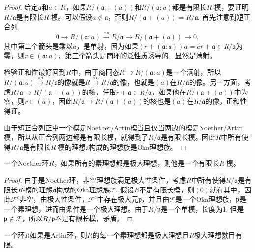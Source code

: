 \begin{proof} 
	给定$\mathfrak{a}$和$a\in R$，如果$R/(\mathfrak{a}+(a))$和$R/(\mathfrak{a}:a)$都是有限长$R$-模，要证明$R/\mathfrak{a}$是有限长$R$-模。可以假设$a\not\in \mathfrak{a}$，否则$R/(\mathfrak{a}+(a))=R/\mathfrak{a}$. 首先注意到短正合列
	\[
		0\to R/(\mathfrak{a}:a)\xrightarrow{\times a} R/\mathfrak{a} \to R/(\mathfrak{a}+(a))\to 0,
	\]
	其中第二个箭头是乘以$a$，是单射，因为如果$(r+(\mathfrak{a}:a))a=ar+\mathfrak{a}\in R/\mathfrak{a}$为零，则$r\in (\mathfrak{a}:a)$，第三个箭头是商环的泛性质诱导的，显然是满射。

	检验正和性最好回到$R$中，由于商同态$R\to R/(\mathfrak{a}:a)$是一个满射，所以$R/(\mathfrak{a}:a)\xrightarrow{\times a} R/\mathfrak{a}$的像就是$R\xrightarrow{\times a} R/\mathfrak{a}$的像，也就是$(a)$在$R/\mathfrak{a}$的像。另一方面，考虑$R/\mathfrak{a} \to R/(\mathfrak{a}+(a))$的核，任取$r+\mathfrak{a}\in R/\mathfrak{a}$，如果他在$R/(\mathfrak{a}+(a))$中为零，则$r\in (a)$，因此$R/\mathfrak{a} \to R/(\mathfrak{a}+(a))$的核也是$(a)$在$R/\mathfrak{a}$的像，正和性得证。

	由于短正合列正中一个模是Noether/Artin模当且仅当两边的模是Noether/Artin模，所以从正合列两边都是有限长模，就得到了$R/\mathfrak{a}$是有限长模。因此$R$中所有使得$R/\mathfrak{a}$是有限长$R$-模的理想$\mathfrak{a}$构成的理想族是Oka理想族。
\end{proof}

\begin{pro}
一个Noether环$R$，如果所有的素理想都是极大理想，则他是一个有限长$R$-模。
\end{pro}

\begin{proof}
	由于是Noether环，非空理想族满足极大性条件，考虑$R$中所有使得$R/\mathfrak{a}$是有限长$R$-模的理想$\mathfrak{a}$构成的Oka理想族$\mathcal{F}$. 假设$R$不是有限长模，则$(0)$就在其中，因此$\mathcal{F}^c$非空，由极大性条件，$\mathcal{F}^c$中存在极大元$\mathfrak{p}$，并且由$\mathcal{F}$是一个Oka理想族，$\mathfrak{p}$是一个素理想，进而由条件是一个极大理想。由于$R/\mathfrak{p}$是一个单模，长度为1. 但是$\mathfrak{p}\not\in \mathcal{F}$，所以$R/\mathfrak{p}$不是有限长模，矛盾。
\end{proof}

\begin{pro}
一个环$R$如果是Artin环，则$R$的每一个素理想都是极大理想且$R$极大理想数目有限。

\end{pro}

